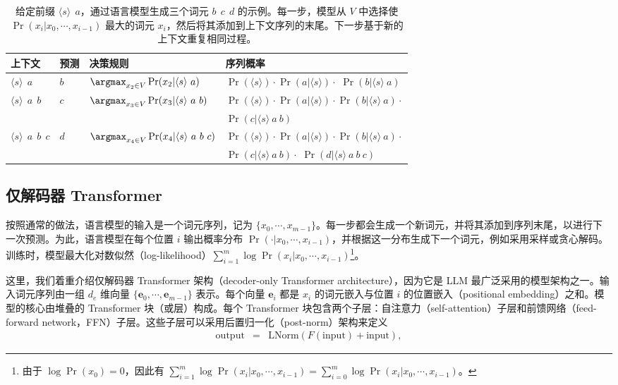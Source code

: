 \begin{table}[t]
\centering
\begingroup
\renewcommand{\arraystretch}{1.2}
\begin{tabular}{l | l | l | l}
上下文 & 预测 & 决策规则 & 序列概率 \\ \hline
$\langle s \rangle\ \ a$ & $b$ & $\argmax_{x_2 \in V} \Pr(x_{2}|\langle s \rangle\ a)$ & $\Pr(\langle s \rangle) \cdot \Pr(a|\langle s \rangle) \cdot $ \colorbox{gray!30}{$\Pr(b|\langle s \rangle\ a)$} \\ \hline
$\langle s \rangle\ \ a\ \ b$ & $c$ & $\argmax_{x_3 \in V} \Pr(x_{3}|\langle s \rangle\ a\ b)$ & $\Pr(\langle s \rangle) \cdot \Pr(a|\langle s \rangle) \cdot \Pr(b|\langle s \rangle\ a) \cdot$ \\
& & & \colorbox{gray!30}{$\Pr(c|\langle s \rangle\ a\ b)$} \\ \hline
$\langle s \rangle\ \ a\ \ b\ \ c$ & $d$ & $\argmax_{x_4 \in V} \Pr(x_{4}|\langle s \rangle\ a\ b\ c)$ & $\Pr(\langle s \rangle) \cdot \Pr(a|\langle s \rangle) \cdot \Pr(b|\langle s \rangle\ a) \cdot$ \\
& & & $\Pr(c|\langle s \rangle\ a\ b) \cdot $ \colorbox{gray!30}{$\Pr(d|\langle s \rangle\ a\ b\ c)$} \\
\end{tabular}
\endgroup
\caption{给定前缀 $\langle s \rangle\ \ a$，通过语言模型生成三个词元 $b\ \ c\ \ d$ 的示例。每一步，模型从 $V$ 中选择使 $\Pr(x_{i}|x_0,\cdots,x_{i-1})$ 最大的词元 $x_i$，然后将其添加到上下文序列的末尾。下一步基于新的上下文重复相同过程。}
\label{tab:lm-generation-abcd}
\end{table}

\subsection{仅解码器 Transformer}
\label{sec:decoder-only-transformers}

\noindent 按照通常的做法，语言模型的输入是一个词元序列，记为 $\{x_0,\cdots,x_{m-1}\}$。每一步都会生成一个新词元，并将其添加到序列末尾，以进行下一次预测。为此，语言模型在每个位置 $i$ 输出概率分布 $\Pr(\cdot|x_0,\cdots,x_{i-1})$，并根据这一分布生成下一个词元，例如采用采样或贪心解码。训练时，模型最大化对数似然（log-likelihood）$\sum_{i=1}^{m} \log \Pr(x_i|x_0,\allowbreak \cdots,x_{i-1})$\footnote{由于 $\log \Pr(x_0) = 0$，因此有 $\sum_{i=1}^{m} \log \Pr(x_i|x_0,\cdots,x_{i-1}) = \sum_{i=0}^{m} \log \Pr(x_i | x_0,\cdots,x_{i-1})$。}。

这里，我们着重介绍仅解码器 Transformer 架构（decoder-only Transformer architecture），因为它是 LLM 最广泛采用的模型架构之一。输入词元序列由一组 $d_e$ 维向量 $\{\mathbf{e}_0,\cdots,\mathbf{e}_{m-1}\}$ 表示。每个向量 $\mathbf{e}_i$ 都是 $x_i$ 的词元嵌入与位置 $i$ 的位置嵌入（positional embedding）之和。模型的核心由堆叠的 Transformer 块（或层）构成。每个 Transformer 块包含两个子层：自注意力（self-attention）子层和前馈网络（feed-forward network，FFN）子层。这些子层可以采用后置归一化（post-norm）架构来定义
\begin{eqnarray}
\mathrm{output} & = & \mathrm{LNorm}(F(\mathrm{input}) + \mathrm{input}) \label{eq:post-norm-lm},
\end{eqnarray}

